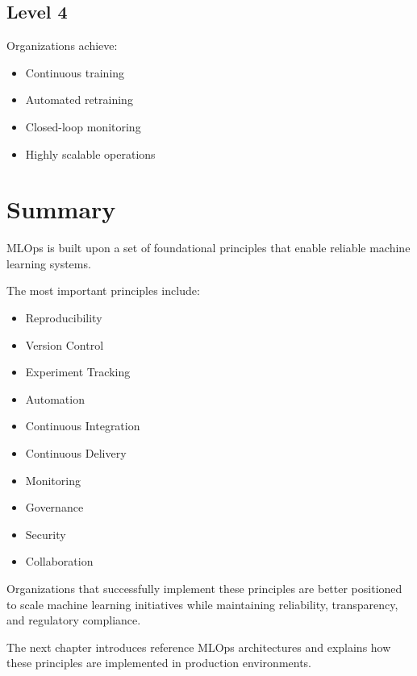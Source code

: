 \subsection{Level 4}

Organizations achieve:

\begin{itemize}
    \item Continuous training
    \item Automated retraining
    \item Closed-loop monitoring
    \item Highly scalable operations
\end{itemize}

\section{Summary}

MLOps is built upon a set of foundational principles that enable reliable machine learning systems.

The most important principles include:

\begin{itemize}
    \item Reproducibility
    \item Version Control
    \item Experiment Tracking
    \item Automation
    \item Continuous Integration
    \item Continuous Delivery
    \item Monitoring
    \item Governance
    \item Security
    \item Collaboration
\end{itemize}

Organizations that successfully implement these principles are better positioned to scale machine learning initiatives while maintaining reliability, transparency, and regulatory compliance.

The next chapter introduces reference MLOps architectures and explains how these principles are implemented in production environments.